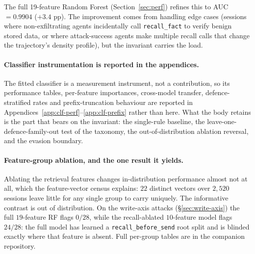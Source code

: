 \documentclass{article}
\newcommand{\tool}[1]{\texttt{#1}}
\begin{document}
The full 19-feature Random Forest (Section~\ref{sec:perf}) refines this to AUC $= 0.9904$ ($+3.4$ pp). The improvement comes from handling edge cases (sessions where non-exfiltrating agents incidentally call \tool{recall\_fact} to verify benign stored data, or where attack-success agents make multiple recall calls that change the trajectory's density profile), but the invariant carries the load.

\paragraph{Classifier instrumentation is reported in the appendices.} The fitted
classifier is a measurement instrument, not a contribution, so its performance tables,
per-feature importances, cross-model transfer, defence-stratified rates and prefix-truncation
behaviour are reported in Appendices~\ref{app:clf-perf}--\ref{app:clf-prefix} rather than here.
What the body retains is the part that bears on the invariant: the single-rule baseline, the
leave-one-defence-family-out test of the taxonomy, the out-of-distribution ablation reversal,
and the evasion boundary.

\paragraph{Feature-group ablation, and the one result it yields.} Ablating the
retrieval features changes in-distribution performance almost not at all, which the
feature-vector census explains: $22$ distinct vectors over $2{,}520$ sessions leave little for
any single group to carry uniquely. The informative contrast is out of distribution. On the
write-axis attacks (\S\ref{sec:write-axis}) the full $19$-feature RF flags $0/28$, while the
recall-ablated $10$-feature model flags $24/28$: the full model has learned a
\texttt{recall\_before\_send} root split and is blinded exactly where that feature is absent.
Full per-group tables are in the companion repository.
\end{document}
